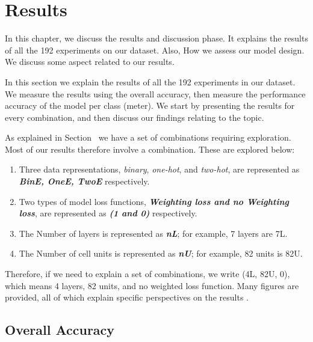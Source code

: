 \chapter{Results}\label{Sec:Results}

In this chapter, we discuss the results and discussion phase. It explains the results of all the 192 experiments on our dataset. Also, How we assess our model design. We discuss some aspect related to our results.

In this section we explain the results of all the 192 experiments in our dataset. We measure the results using the overall accuracy, then measure the performance accuracy of the model per class (meter). We start by presenting the results for every combination, and then discuss our findings relating to the topic.

As explained in Section~ we have a set of combinations requiring exploration. Most of our results therefore involve a combination. These are explored below:

\begin{enumerate}

 \item Three data representations, \textit{binary}, \textit{one-hot}, and \textit{two-hot}, are represented as \textbf{\textit{BinE, OneE, TwoE}} respectively.
 \item Two types of model loss functions, \textbf{\textit{Weighting loss and no Weighting loss}}, are represented as \textbf{\textit{(1 and 0)}} respectively.
 \item The Number of layers is represented as \textbf{\textit{nL}}; for example, 7 layers are 7L.
 \item The Number of cell units is represented as \textbf{\textit{nU}}; for example, 82 units is 82U.

\end{enumerate}

Therefore, if we need to explain a set of combinations, we write (4L, 82U, 0), which means 4 layers, 82 units, and no weighted loss function. Many figures are provided, all of which explain specific perspectives on the results .

\section{Overall Accuracy}

